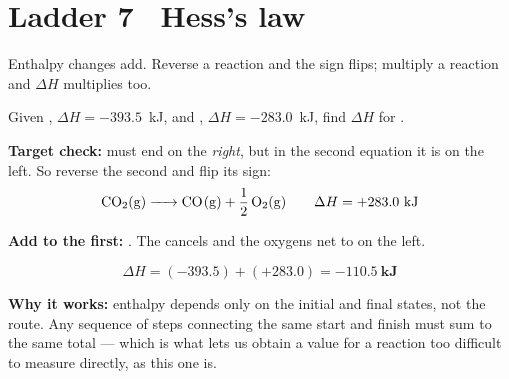 \documentclass{apchem-worksheet}
\begin{document}
\section*{\sffamily Ladder 7 \textbullet\ Hess's law}

Enthalpy changes add. Reverse a reaction and the sign flips; multiply a
reaction and $\Delta H$ multiplies too.

\begin{workedexample}
Given
, $\Delta H = -393.5$~kJ, and
, $\Delta H = -283.0$~kJ,
find $\Delta H$ for .

\textbf{Target check:}  must end on the \emph{right}, but in the
second equation it is on the left. So reverse the second and flip its
sign:
\[ \ce{CO2(g) -> CO(g) + 1/2O2(g)} \qquad \Delta H = +283.0~\text{kJ} \]

\textbf{Add to the first:}
. The  cancels and the
oxygens net to  on the left.

\[ \Delta H = (-393.5) + (+283.0) = \mathbf{-110.5~kJ} \]

\textbf{Why it works:} enthalpy depends only on the initial and final
states, not the route. Any sequence of steps connecting the same start and
finish must sum to the same total --- which is what lets us obtain a value
for a reaction too difficult to measure directly, as this one is.
\end{workedexample}
\end{document}
